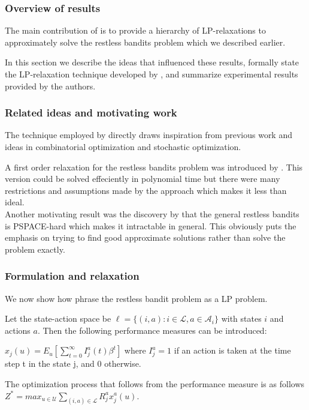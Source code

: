\subsubsection{Overview of results}
The main contribution of \citep{bertsimas} is to provide a hierarchy of LP-relaxations
to approximately solve the restless bandits problem which we described earlier.

In this section we describe the ideas that influenced these results, formally state the LP-relaxation technique developed by \citep{bertsimas}, and  summarize experimental results provided by the authors.

\subsubsection{Related ideas and motivating work}
The technique employed by \citep{bertsimas} directly draws inspiration from previous work and ideas in combinatorial optimization and stochastic optimization. 

A first order relaxation for the restless bandits problem was introduced by \citep{whittle}. This version could be solved effeciently in polynomial time but there were many restrictions and assumptions made by the approach which makes it less than ideal.\\

Another motivating result was the discovery  by \citep{papad}that the general restless bandits is PSPACE-hard which makes it intractable in general. This obviously puts the emphasis on trying to find good approximate solutions rather than solve the problem exactly. \\ 

\subsubsection{Formulation and relaxation}

We now show how \citep{bertsimas} phrase the restless bandit problem as a LP problem. 

Let the state-action space be  $\ell= \{(i,a): i \in \mathcal{L}, a \in  \mathcal{A}_i \}$
with states $i$ and actions $a$. Then the following performance measures can be introduced:

$x_j(u) = E_u[\sum_{t=0}^{\infty}I_j^a(t) \beta^t]$ where $I_j^a = 1$ if an action is taken at the time step t in the state j, and 0 otherwise. 

The optimization process that follows from the performance measure is as follows 
$Z^* = max_{u \in \mathcal{U}} \sum_{(i,a) \in \mathcal{L}} R_j^a x_j^a(u)$.  

